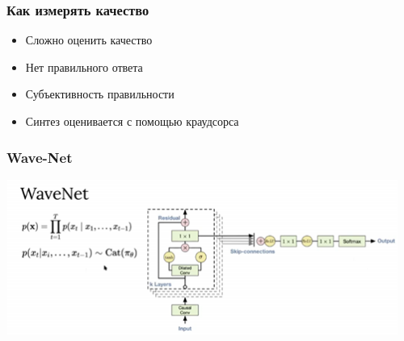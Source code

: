 \documentclass[a4paper, 12pt]{article}
\begin{document}
\subsubsection{Как измерять
качество}\label{ux43aux430ux43a-ux438ux437ux43cux435ux440ux44fux442ux44c-ux43aux430ux447ux435ux441ux442ux432ux43e}

\begin{itemize}
\item
  
  Сложно оценить качество
  
\item
  
  Нет правильного ответа
  
\item
  
  Субъективность правильности
  
\item
  
  Синтез оценивается с помощью краудсорса
  
\end{itemize}

\subsubsection{Wave-Net}\label{wave-net}

\includegraphics[width=5.05085in,height=2.00567in]{media/image2.png}
\end{document}
